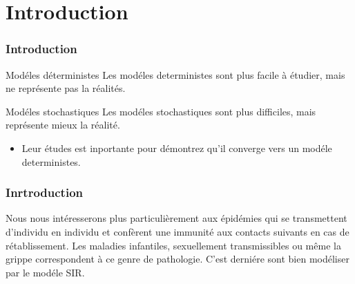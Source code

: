\section{Introduction}

\begin{frame}
    \frametitle{Introduction}

    \begin{block}{Modéles déterministes}
        Les modéles deterministes sont plus facile à étudier, mais ne représente pas la réalités.
    \end{block}


    \begin{block}{Modéles stochastiques}
        Les modéles stochastiques sont plus difficiles, mais représente mieux la réalité.

        \begin{itemize}
            \item Leur études est inportante pour démontrez qu'il converge vers un modéle deterministes.
        \end{itemize}
    \end{block}
\end{frame}

\begin{frame}
    \frametitle{Inrtroduction}

    Nous nous intéresserons plus particulièrement aux épidémies qui se transmettent d’individu en individu et confèrent une immunité aux contacts suivants en cas de rétablissement. Les maladies infantiles, sexuellement transmissibles ou même la grippe correspondent à ce genre de pathologie. C'est derniére sont bien modéliser par le modéle SIR.

\end{frame}
